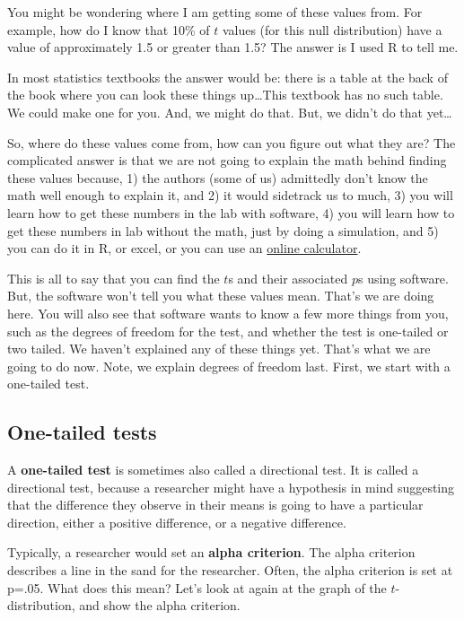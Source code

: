 \documentclass[
]{book}
\begin{document}
You might be wondering where I am getting some of these values from. For example, how do I know that 10\% of \(t\) values (for this null distribution) have a value of approximately 1.5 or greater than 1.5? The answer is I used R to tell me.

In most statistics textbooks the answer would be: there is a table at the back of the book where you can look these things up\ldots This textbook has no such table. We could make one for you. And, we might do that. But, we didn't do that yet\ldots{}

So, where do these values come from, how can you figure out what they are? The complicated answer is that we are not going to explain the math behind finding these values because, 1) the authors (some of us) admittedly don't know the math well enough to explain it, and 2) it would sidetrack us to much, 3) you will learn how to get these numbers in the lab with software, 4) you will learn how to get these numbers in lab without the math, just by doing a simulation, and 5) you can do it in R, or excel, or you can use an \href{http://www.socscistatistics.com/pvalues/tdistribution.aspx}{online calculator}.

This is all to say that you can find the \(t\)s and their associated \(p\)s using software. But, the software won't tell you what these values mean. That's we are doing here. You will also see that software wants to know a few more things from you, such as the degrees of freedom for the test, and whether the test is one-tailed or two tailed. We haven't explained any of these things yet. That's what we are going to do now. Note, we explain degrees of freedom last. First, we start with a one-tailed test.

\subsection{One-tailed tests}\label{one-tailed-tests}

A \textbf{one-tailed test} is sometimes also called a directional test. It is called a directional test, because a researcher might have a hypothesis in mind suggesting that the difference they observe in their means is going to have a particular direction, either a positive difference, or a negative difference.

Typically, a researcher would set an \textbf{alpha criterion}. The alpha criterion describes a line in the sand for the researcher. Often, the alpha criterion is set at p=.05. What does this mean? Let's look at again at the graph of the \(t\)-distribution, and show the alpha criterion.
\end{document}
